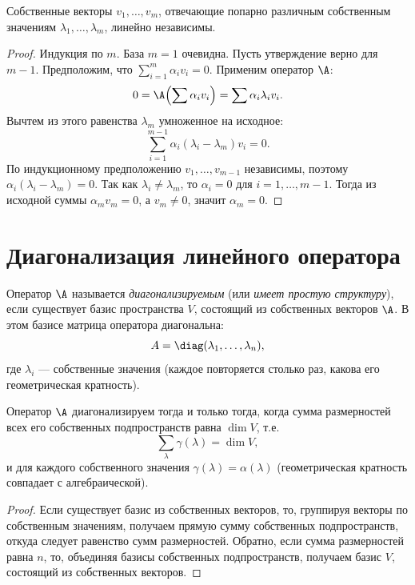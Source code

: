 \documentclass[10pt]{article}
\begin{document}
\begin{theorem}
    Собственные векторы $v_1,\dots,v_m$, отвечающие попарно различным собственным значениям $\lambda_1,\dots,\lambda_m$, линейно независимы.
\end{theorem}
\begin{proof}
    Индукция по $m$. База $m=1$ очевидна. Пусть утверждение верно для $m-1$. Предположим, что $\sum_{i=1}^m \alpha_i v_i = 0$. Применим оператор $\A$:
    \[
    0 = \A\Bigl(\sum \alpha_i v_i\Bigr) = \sum \alpha_i \lambda_i v_i.
    \]
    Вычтем из этого равенства $\lambda_m$ умноженное на исходное:
    \[
    \sum_{i=1}^{m-1} \alpha_i (\lambda_i - \lambda_m) v_i = 0.
    \]
    По индукционному предположению $v_1,\dots,v_{m-1}$ независимы, поэтому $\alpha_i(\lambda_i-\lambda_m)=0$. Так как $\lambda_i\neq\lambda_m$, то $\alpha_i=0$ для $i=1,\dots,m-1$. Тогда из исходной суммы $\alpha_m v_m=0$, а $v_m\neq0$, значит $\alpha_m=0$.
\end{proof}

\section{Диагонализация линейного оператора}

\begin{definition}
    Оператор $\A$ называется \textit{диагонализируемым} (или \textit{имеет простую структуру}), если существует базис пространства $V$, состоящий из собственных векторов $\A$. В этом базисе матрица оператора диагональна:
    \[
    A = \diag(\lambda_1,\dots,\lambda_n),
    \]
    где $\lambda_i$ --- собственные значения (каждое повторяется столько раз, какова его геометрическая кратность).
\end{definition}

\begin{theorem}
    Оператор $\A$ диагонализируем тогда и только тогда, когда сумма размерностей всех его собственных подпространств равна $\dim V$, т.е.
    \[
    \sum_{\lambda} \gamma(\lambda) = \dim V,
    \]
    и для каждого собственного значения $\gamma(\lambda)=\alpha(\lambda)$ (геометрическая кратность совпадает с алгебраической).
\end{theorem}
\begin{proof}
    Если существует базис из собственных векторов, то, группируя векторы по собственным значениям, получаем прямую сумму собственных подпространств, откуда следует равенство сумм размерностей. Обратно, если сумма размерностей равна $n$, то, объединяя базисы собственных подпространств, получаем базис $V$, состоящий из собственных векторов.
\end{proof}
\end{document}
